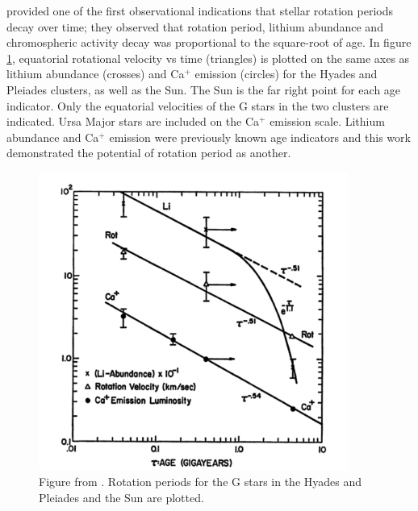 \citet{Skumanich1972} provided one of the first observational indications that
stellar rotation periods decay over time; they observed that rotation period,
lithium abundance and chromospheric activity decay was proportional to the
square-root of age.
In figure \ref{fig:skumanich}, equatorial rotational velocity vs time
(triangles) is plotted on the same axes as lithium abundance (crosses) and
Ca$^+$ emission (circles) for the Hyades and Pleiades clusters, as well as the
Sun.
The Sun is the far right point for each age indicator.
Only the equatorial velocities of the G stars in the two clusters are
indicated.
Ursa Major stars are included on the Ca$^+$ emission scale.
Lithium abundance and Ca$^+$ emission were previously known age indicators and
this work demonstrated the potential of rotation period as another.

\begin{figure}
\begin{center}
\includegraphics[width=4in, clip=true]{figures/skumanich.pdf}
\caption{Figure from \citet{skumanich1972}. Rotation periods for the G stars
in the Hyades and Pleiades and the Sun are plotted.}
\label{fig:skumanich}
\end{center}
\end{figure}

